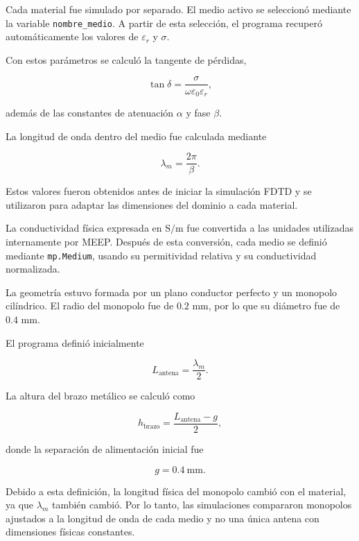 Cada material fue simulado por separado. El medio activo se seleccionó mediante la variable \texttt{nombre\_medio}. A partir de esta selección, el programa recuperó automáticamente los valores de $\varepsilon_r$ y $\sigma$.

Con estos parámetros se calculó la tangente de pérdidas,

\begin{equation}
\tan\delta=
\frac{\sigma}
{\omega\varepsilon_0\varepsilon_r},
\end{equation}

además de las constantes de atenuación $\alpha$ y fase $\beta$.

La longitud de onda dentro del medio fue calculada mediante

\begin{equation}
\lambda_m=\frac{2\pi}{\beta}.
\end{equation}

Estos valores fueron obtenidos antes de iniciar la simulación FDTD y se utilizaron para adaptar las dimensiones del dominio a cada material.

La conductividad física expresada en $\mathrm{S/m}$ fue convertida a las unidades utilizadas internamente por MEEP. Después de esta conversión, cada medio se definió mediante \texttt{mp.Medium}, usando su permitividad relativa y su conductividad normalizada.

La geometría estuvo formada por un plano conductor perfecto y un monopolo cilíndrico. El radio del monopolo fue de $0.2$ mm, por lo que su diámetro fue de $0.4$ mm.

El programa definió inicialmente

\begin{equation}
L_{\mathrm{antena}}=\frac{\lambda_m}{2}.
\end{equation}

La altura del brazo metálico se calculó como

\begin{equation}
h_{\mathrm{brazo}}
=
\frac{L_{\mathrm{antena}}-g}{2},
\end{equation}

donde la separación de alimentación inicial fue

\begin{equation}
g=0.4\ \mathrm{mm}.
\end{equation}

Debido a esta definición, la longitud física del monopolo cambió con el material, ya que $\lambda_m$ también cambió. Por lo tanto, las simulaciones compararon monopolos ajustados a la longitud de onda de cada medio y no una única antena con dimensiones físicas constantes.

